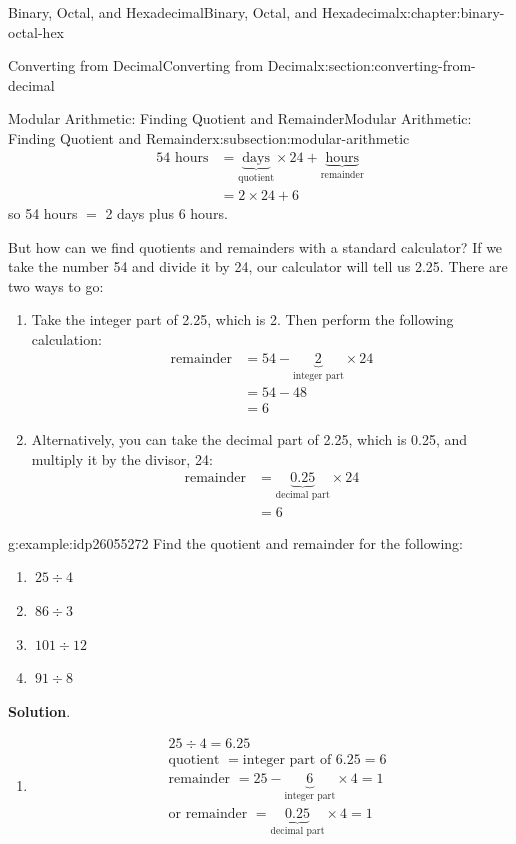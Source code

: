 \documentclass[twoside,10pt,]{book}
\newcommand{\blocktitlefont}{\relax}
\numberwithin{equation}{section}
\newcommand{\amp}{&}
\begin{document}
\begin{chapterptx}{Binary, Octal, and Hexadecimal}{}{Binary, Octal, and Hexadecimal}{}{}{x:chapter:binary-octal-hex}
\begin{sectionptx}{Converting from Decimal}{}{Converting from Decimal}{}{}{x:section:converting-from-decimal}
\begin{subsectionptx}{Modular Arithmetic: Finding Quotient and Remainder}{}{Modular Arithmetic: Finding Quotient and Remainder}{}{}{x:subsection:modular-arithmetic}
\begin{align*}
54 \text{ hours} \amp =\underbrace{\text{days}}_{\text{quotient}}\times 24+\underbrace{\text{hours}}_{\text{remainder}}\\
\amp = 2\times 24+6
\end{align*}
so 54 hours \(=\) 2 days plus 6 hours.%
\par
But how can we find quotients and remainders with a standard calculator?  If we take the number 54 and divide it by 24, our calculator will tell us 2.25.  There are two ways to go:%
\begin{enumerate}
\item{}Take the integer part of 2.25, which is 2.  Then perform the following calculation:%
\begin{align*}
\text{remainder} \amp = 54-\underbrace{2}_{\text{integer part}}\times 24\\
\amp = 54-48\\
\amp = 6
\end{align*}
%
\item{}Alternatively, you can take the decimal part of 2.25, which is 0.25, and multiply it by the divisor, 24:%
\begin{align*}
\text{remainder} \amp = \underbrace{0.25}_{\text{decimal part}}\times 24\\
\amp = 6
\end{align*}
%
\end{enumerate}
%
\begin{example}{}{g:example:idp26055272}%
Find the quotient and remainder for the following: %
\begin{enumerate}
\item{}\(\displaystyle \ 25\div 4\)%
\item{}\(\displaystyle \ 86\div 3\)%
\item{}\(\displaystyle \ 101\div 12\)%
\item{}\(\displaystyle \ 91\div 8\)%
\end{enumerate}
\par\smallskip%
\noindent\textbf{\blocktitlefont Solution}.\label{g:solution:idp26049768}{}\hypertarget{g:solution:idp26049768}{}\quad{}%
\begin{enumerate}
\item{}%
\begin{align*}
\amp 25\div 4=6.25\\
\amp \text{quotient }=\text{integer part of }6.25=6\\
\amp \text{remainder }=25-\underbrace{6}_{\text{integer part}} \times 4=1\\
\amp \text{or remainder }=\underbrace{0.25}_{\text{decimal part}}\times 4=1

\end{align*}
\end{enumerate}
\end{example}
\end{subsectionptx}
\end{sectionptx}
\end{chapterptx}
\end{document}
